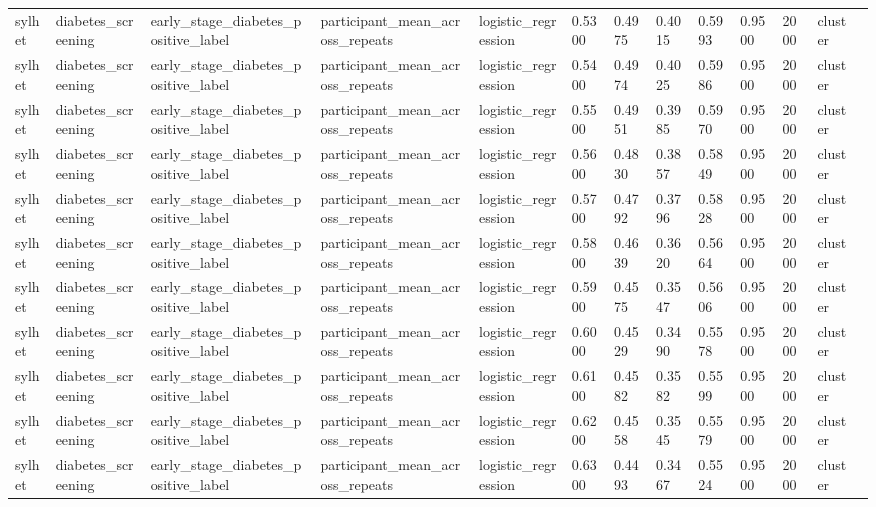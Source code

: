 \begin{tabular}{lllllllllllll}
sylhet & diabetes\_screening & early\_stage\_diabetes\_positive\_label & participant\_mean\_across\_repeats & logistic\_regression & 0.5300 & 0.4975 & 0.4015 & 0.5993 & 0.9500 & 2000 & cluster &  \\
sylhet & diabetes\_screening & early\_stage\_diabetes\_positive\_label & participant\_mean\_across\_repeats & logistic\_regression & 0.5400 & 0.4974 & 0.4025 & 0.5986 & 0.9500 & 2000 & cluster &  \\
sylhet & diabetes\_screening & early\_stage\_diabetes\_positive\_label & participant\_mean\_across\_repeats & logistic\_regression & 0.5500 & 0.4951 & 0.3985 & 0.5970 & 0.9500 & 2000 & cluster &  \\
sylhet & diabetes\_screening & early\_stage\_diabetes\_positive\_label & participant\_mean\_across\_repeats & logistic\_regression & 0.5600 & 0.4830 & 0.3857 & 0.5849 & 0.9500 & 2000 & cluster &  \\
sylhet & diabetes\_screening & early\_stage\_diabetes\_positive\_label & participant\_mean\_across\_repeats & logistic\_regression & 0.5700 & 0.4792 & 0.3796 & 0.5828 & 0.9500 & 2000 & cluster &  \\
sylhet & diabetes\_screening & early\_stage\_diabetes\_positive\_label & participant\_mean\_across\_repeats & logistic\_regression & 0.5800 & 0.4639 & 0.3620 & 0.5664 & 0.9500 & 2000 & cluster &  \\
sylhet & diabetes\_screening & early\_stage\_diabetes\_positive\_label & participant\_mean\_across\_repeats & logistic\_regression & 0.5900 & 0.4575 & 0.3547 & 0.5606 & 0.9500 & 2000 & cluster &  \\
sylhet & diabetes\_screening & early\_stage\_diabetes\_positive\_label & participant\_mean\_across\_repeats & logistic\_regression & 0.6000 & 0.4529 & 0.3490 & 0.5578 & 0.9500 & 2000 & cluster &  \\
sylhet & diabetes\_screening & early\_stage\_diabetes\_positive\_label & participant\_mean\_across\_repeats & logistic\_regression & 0.6100 & 0.4582 & 0.3582 & 0.5599 & 0.9500 & 2000 & cluster &  \\
sylhet & diabetes\_screening & early\_stage\_diabetes\_positive\_label & participant\_mean\_across\_repeats & logistic\_regression & 0.6200 & 0.4558 & 0.3545 & 0.5579 & 0.9500 & 2000 & cluster &  \\
sylhet & diabetes\_screening & early\_stage\_diabetes\_positive\_label & participant\_mean\_across\_repeats & logistic\_regression & 0.6300 & 0.4493 & 0.3467 & 0.5524 & 0.9500 & 2000 & cluster &  \\

\end{tabular}
